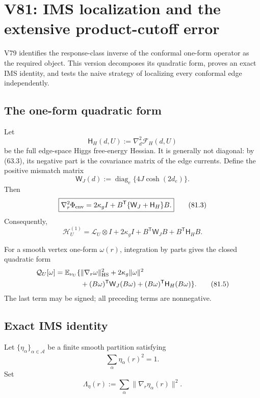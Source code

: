 \documentclass[11pt]{article}
\theoremstyle{remark}
\begin{document}
\section{V81: IMS localization and the extensive product-cutoff error}
\label{sec:v17v81}

V79 identifies the response-class inverse of the conformal one-form
operator as the required object.  This version decomposes its quadratic
form, proves an exact IMS identity, and tests the naive strategy of
localizing every conformal edge independently.

\subsection{The one-form quadratic form}

Let
\[
 \mathsf H_H(d,U):=\nabla_d^2\mathcal F_H(d,U)     \tag{81.1}
\]
be the full edge-space Higgs free-energy Hessian.  It is generally not
diagonal: by (63.3), its negative part is the covariance matrix of the
edge currents.  Define the positive mismatch matrix
\[
 \mathsf W_J(d)
 :=\operatorname{diag}_e\{4J\cosh(2d_e)\}.        \tag{81.2}
\]
Then
\[
\boxed{
 \nabla_r^2\Phi_{\rm env}
 =2\kappa_gI+B^{\mathsf T}
   \{\mathsf W_J+\mathsf H_H\}B.}                 \tag{81.3}
\]
Consequently,
\[
 \mathscr H_U^{(1)}
 =\mathscr L_U\otimes I+2\kappa_gI
 +B^{\mathsf T}\mathsf W_JB
 +B^{\mathsf T}\mathsf H_HB.                    \tag{81.4}
\]

For a smooth vertex one-form \(\omega(r)\), integration by parts gives
the closed quadratic form
\[
\begin{aligned}
 \mathcal Q_U[\omega]
 =\mathbb E_{\nu_U}\{&\|\nabla_r\omega\|_{\rm HS}^2
 +2\kappa_g\|\omega\|^2\\
 &+(B\omega)^{\mathsf T}\mathsf W_J(B\omega)
 +(B\omega)^{\mathsf T}\mathsf H_H(B\omega)\}.
                                                               \tag{81.5}
\end{aligned}
\]
The last term may be signed; all preceding terms are nonnegative.

\subsection{Exact IMS identity}

Let \(\{\eta_\alpha\}_{\alpha\in\mathcal A}\) be a finite smooth
partition satisfying
\[
 \sum_\alpha\eta_\alpha(r)^2=1.                  \tag{81.6}
\]
Set
\[
 \Lambda_\eta(r):=
 \sum_\alpha\|\nabla_r\eta_\alpha(r)\|^2.        \tag{81.7}
\]
\end{document}

